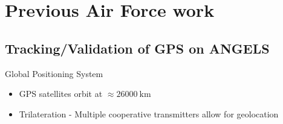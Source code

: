 
\section[AFRL Work]{Previous Air Force work}
\subsection[ANGELS]{Tracking/Validation of GPS on ANGELS}

\begin{frame}{Global Positioning System}
    \begin{itemize}
        \item GPS satellites orbit at \( \approx \SI{26000}{\kilo\meter} \)
        \item Trilateration - Multiple cooperative transmitters allow for geolocation
    \end{itemize}
\end{frame}

